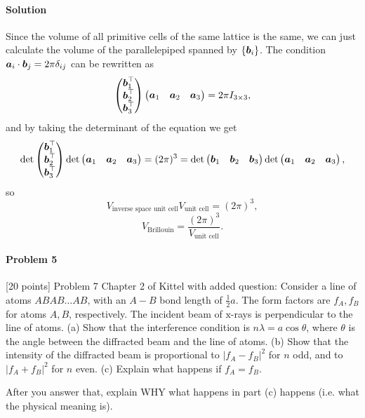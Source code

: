 \documentclass[hyperref, a4paper]{article}
\begin{document}
\paragraph{Solution} Since the volume of all primitive cells of the same lattice is the same,
we can just calculate the volume of the parallelepiped spanned by $\{\vb*{b}_i\}$.
The condition $\vb*{a}_i \cdot \vb*{b}_j = 2\pi \delta_{ij}$ can be rewritten as 
\[
    \pmqty{ \vb*{b}_1^\top \\ \vb*{b}_2^\top \\ \vb*{b}_3^\top } \pmqty{ \vb*{a}_1 & \vb*{a}_2 & \vb*{a}_3 } = 2\pi I_{3 \times 3},
\]
and by taking the determinant of the equation we get 
\[
    \det \pmqty{ \vb*{b}_1^\top \\ \vb*{b}_2^\top \\ \vb*{b}_3^\top } \det \pmqty{ \vb*{a}_1 & \vb*{a}_2 & \vb*{a}_3 } = (2\pi)^3 = \det \pmqty{ \vb*{b}_1 & \vb*{b}_2 & \vb*{b}_3 } \det \pmqty{\vb*{a}_1 & \vb*{a}_2 & \vb*{a}_3},
\]
so 
\[
    V_{\text{inverse space unit cell}} V_{\text{unit cell}} = (2\pi)^3,
\]
\begin{equation}
    V_{\text{Brillouin}} = \frac{(2\pi)^3}{V_{\text{unit cell}}}.
\end{equation}

\paragraph{Problem 5} [20 points] Problem 7 Chapter 2 of Kittel with added question:
Consider a line of atoms $A B A B \ldots A B$, with an $A-B$ bond length of $\frac{1}{2} a$. The form factors are $f_A, f_B$ for atoms $A, B$, respectively. The incident beam of $\mathrm{x}$-rays is perpendicular to the line of atoms. (a) Show that the interference condition is $n \lambda=a \cos \theta$, where $\theta$ is the angle between the diffracted beam and the line of atoms. (b) Show that the intensity of the diffracted beam is proportional to $\left|f_A-f_B\right|^2$ for $n$ odd, and to $\left|f_A+f_B\right|^2$ for $n$ even. (c) Explain what happens if $f_A=f_B$.

After you answer that, explain WHY what happens in part (c) happens (i.e. what the physical meaning is).
\end{document}
